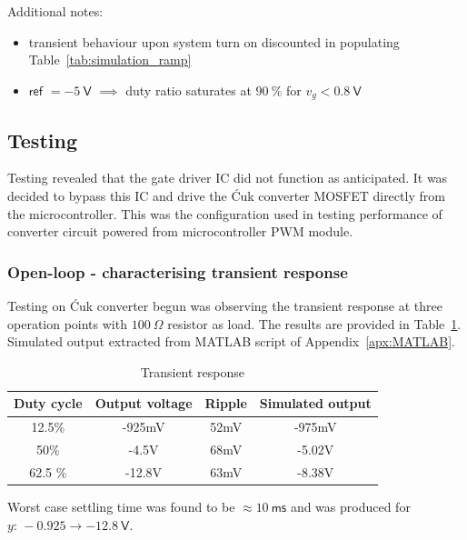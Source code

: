 Additional notes:
\begin{itemize}
    \item transient behaviour upon system turn on discounted in populating Table~\ref{tab:simulation_ramp}
    \item $\textsf{ref } = \minus 5 \ \mathsf{V}$ $\implies$ duty ratio saturates at $90 \ \mathsf{\%}$ for $v_g < 0.8 \ \mathsf{V}$
\end{itemize}
\subsection{Testing}
Testing revealed that the gate driver IC did not function as anticipated. It was decided to bypass this IC and drive the \'{C}uk converter MOSFET directly from the microcontroller. This was the configuration used in testing performance of converter circuit powered from microcontroller PWM module.
\subsubsection{Open-loop - characterising transient response}
Testing on \'{C}uk converter begun was observing the transient response at three operation points with $100 \ \mathsf{\Omega}$ resistor as load. The results are provided in Table~\ref{tab:trans}. Simulated output extracted from \textsf{MATLAB} script of Appendix~\ref{apx:MATLAB}.
\begin{table}[H]
\centering
\begin{tabular}{|c|c|c||c|}
\hline
Duty cycle  & Output voltage & Ripple  & Simulated output \\ \hline \hline
12.5\%      & -925mV         & 52mV     & -975mV \\ \hline
50\%        & -4.5V          & 68mV     & -5.02V\\\hline
62.5 \%     & -12.8V         & 63mV     & -8.38V\\ \hline
\end{tabular}
\caption{Transient response}
\label{tab:trans}
\end{table}
Worst case settling time was found to be $\approx 10 \ \mathsf{ms}$ and was produced for $y \text{: } \minus 0.925 \rightarrow \minus 12.8 \ \mathsf{V}$.

